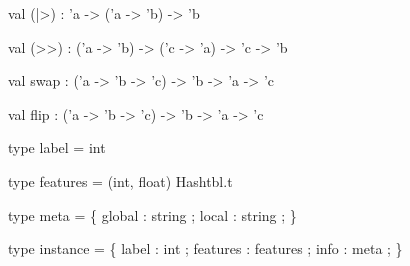 \documentclass[11pt]{article}
\begin{document}
\label{val:Util.(-pipe-gt)}\begin{ocamldoccode}
val (|>) : 'a -> ('a -> 'b) -> 'b
\end{ocamldoccode}




\label{val:Util.(-gt-gt)}\begin{ocamldoccode}
val (>>) : ('a -> 'b) -> ('c -> 'a) -> 'c -> 'b
\end{ocamldoccode}




\label{val:Util.(-dollar)}




\label{val:Util.swap}\begin{ocamldoccode}
val swap : ('a -> 'b -> 'c) -> 'b -> 'a -> 'c
\end{ocamldoccode}




\label{val:Util.flip}\begin{ocamldoccode}
val flip : ('a -> 'b -> 'c) -> 'b -> 'a -> 'c
\end{ocamldoccode}




\label{type:Util.label}\begin{ocamldoccode}
type label = int 
\end{ocamldoccode}




\label{type:Util.features}\begin{ocamldoccode}
type features = (int, float) Hashtbl.t 
\end{ocamldoccode}




\label{type:Util.meta}\begin{ocamldoccode}
type meta = \{
  global : string ;
  local : string ;
\}
\end{ocamldoccode}




\label{type:Util.instance}\begin{ocamldoccode}
type instance = \{
  label : int ;
  features : features ;
  info : meta ;
\}
\end{ocamldoccode}
\end{document}
